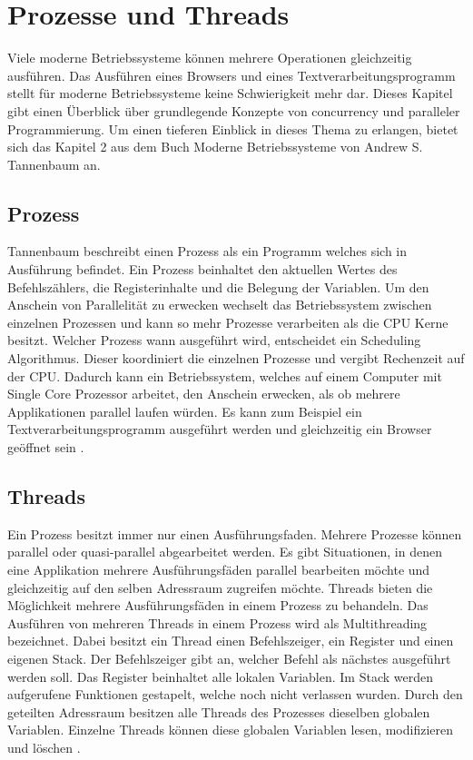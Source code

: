 \section{Prozesse und Threads}

Viele moderne Betriebssysteme können mehrere Operationen gleichzeitig ausführen. Das Ausführen eines Browsers und eines Textverarbeitungsprogramm stellt für moderne Betriebssysteme keine Schwierigkeit mehr dar. Dieses Kapitel gibt einen Überblick über grundlegende Konzepte von concurrency und paralleler Programmierung. Um einen tieferen Einblick in dieses Thema zu erlangen, bietet sich das Kapitel 2 aus dem Buch Moderne Betriebssysteme von Andrew S. Tannenbaum an. 

\subsection{Prozess}
\label{section: Prozess}
Tannenbaum beschreibt einen Prozess als ein Programm welches sich in Ausführung befindet. Ein Prozess beinhaltet den aktuellen Wertes des Befehlszählers, die Registerinhalte und die Belegung der Variablen. Um den Anschein von Parallelität zu erwecken wechselt das Betriebssystem zwischen einzelnen Prozessen und kann so mehr Prozesse verarbeiten als die CPU Kerne besitzt. Welcher Prozess wann ausgeführt wird, entscheidet ein Scheduling Algorithmus. Dieser koordiniert die einzelnen Prozesse und vergibt Rechenzeit auf der CPU. Dadurch kann ein Betriebssystem, welches auf einem Computer mit Single Core Prozessor arbeitet, den Anschein erwecken, als ob mehrere Applikationen parallel laufen würden. Es kann zum Beispiel ein Textverarbeitungsprogramm ausgeführt werden und gleichzeitig ein Browser geöffnet sein \cite[p. 87]{tan09}.

\subsection{Threads}
\label{section: Threads}
Ein Prozess besitzt immer nur einen Ausführungsfaden. Mehrere Prozesse können parallel oder quasi-parallel abgearbeitet werden. Es gibt Situationen, in denen eine Applikation mehrere Ausführungsfäden parallel bearbeiten möchte und gleichzeitig auf den selben Adressraum zugreifen möchte. Threads bieten die Möglichkeit mehrere Ausführungsfäden in einem Prozess zu behandeln. Das Ausführen von mehreren Threads in einem Prozess wird als Multithreading bezeichnet. Dabei besitzt ein Thread einen Befehlszeiger, ein Register und einen eigenen Stack. Der Befehlszeiger gibt an, welcher Befehl als nächstes ausgeführt werden soll. Das Register beinhaltet alle lokalen Variablen. Im Stack werden aufgerufene Funktionen gestapelt, welche noch nicht verlassen wurden. Durch den geteilten Adressraum besitzen alle Threads des Prozesses dieselben globalen Variablen. Einzelne Threads können diese globalen Variablen lesen, modifizieren und löschen \cite[p. 97]{tan09}. 

